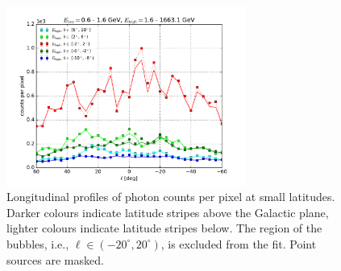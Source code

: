 \documentclass[a4paper]{article}
\begin{document}
\begin{figure}[t]
	\centering
	\includegraphics[width=0.7\textwidth]{FitE_profile_plot_at_0-1_to_1-1663.pdf}
    \caption{Longitudinal profiles of photon counts per pixel at small latitudes. Darker colours indicate latitude stripes above the Galactic plane, lighter colours indicate latitude stripes below. The region of the bubbles, i.e., $\ell \in (-20^\circ,20^\circ)$, is excluded from the fit. Point sources are masked.}
    \label{lowE_likelihood_profiles}
\end{figure}
\end{document}
